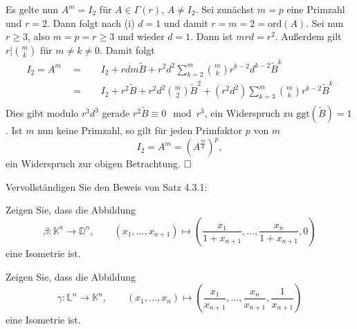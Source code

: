 \documentclass[11pt]{book}
\numberwithin{dummy}{section}
\theoremstyle{nonumberbreak}
\newenvironment{prob}[1][]{\ifthenelse{\equal{#1}{}}{\problem}{\problem[#1]}\rm}{\endproblem}
\newenvironment{sol}[1][]{\ifthenelse{\equal{#1}{}}{\solution}{\solution[#1]}\rm}{\endsolution}
\newcommand{\Loid}{\mathbb{L}}
\newcommand{\D}{\mathbb{D}}
\newcommand{\la}{\longrightarrow}
\begin{document}
\begin{spacing}{1.4}
\begin{prob}
\begin{sol}
\begin{compactenum}
\item Es gelte nun $A^m=I_2$ für $A \in \Gamma(r)$, $A\neq I_2$. Sei zunächst $m=p$ eine Primzahl und $r = 2$. Dann folgt nach (i) $d=1$ und damit $r=m=2= \mathrm{ord}(A)$. Sei nun $r \geqslant 3$, also $m=p=r\geqslant 3$ und wieder $d=1$. Dann ist $mrd=r^2$. Außerdem gilt $r \big\vert \binom{m}{k}$ für $m\neq k \neq 0$. Damit folgt 
\begin{alignat*}{5}
I_2=A^m \ \ &=&& \ \ I_2 + rdm \tilde{B}  + r^2d^2 \sum_{k=2}^m \binom{m}{k} r^{k-2}d^{k-2} \tilde{B}^k \\
&=&& \ \ I_2 + r^2 \tilde{B} + r^2d^2 \binom{m}{2} \tilde{B}^2 + (r^2d^2) \sum_{k=3}^m \binom{m}{k} r^{k-2} \tilde{B}^k \\
\end{alignat*}
Dies gibt modulo $r^3d^3$ gerade $r^2 \tilde{B} \equiv 0 \mod r^3$, ein Widerspruch zu $\mathrm{ggt}(\tilde{B}) = 1$. Ist $m$ nun keine Primzahl, so gilt für jeden Primfaktor $p$ von $m$
$$I_2=A^m = \left( A ^{\frac{m}{p}}\right)^p,$$
ein Widerspruch zur obigen Betrachtung. $\hfill \Box$
\end{compactenum}

\end{sol}

\end{prob}




\begin{prob}    %
Vervollständigen Sie den Beweis von Satz 4.3.1:
\begin{compactenum}
\item Zeigen Sie, dass die Abbildung
$$\beta: \mathbb{K}^n \la \D^n, \qquad (x_1, \ldots, x_{n+1}) \mapsto \left( \frac{x_1}{1+x_{n+1}}, \ldots, \frac{x_n}{1+x_{n+1}}, 0 \right)$$
eine Isometrie ist.
\item Zeigen Sie, dass die Abbildung
$$\gamma: \Loid^n \la \mathbb{K}^n, \qquad (x_1,\ldots, x_n) \mapsto \left( \frac{x_1}{x_{n+1}}, \dots, \frac{x_n}{x_{n+1}}, \frac{1}{x_{n+1}}\right)$$
eine Isometrie ist.
\end{compactenum}


\end{prob}
\end{spacing}
\end{document}

